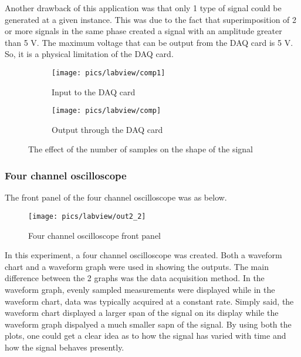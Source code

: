 \noindent
Another drawback of this application was that only 1 type of signal could be generated at a given instance. This was due to the fact that superimposition of 2 or more signals in the same phase created a signal with an amplitude greater than 5 V. The maximum voltage that can be output from the DAQ card is 5 V. So, it is a physical limitation of the DAQ card.


\begin{figure}[!h]
	\centering
	\begin{subfigure}{.5\textwidth}
		\centering
		\texttt{[image: pics/labview/comp1]}
		\caption{Input to the DAQ card}
		\label{fig:sub1}
	\end{subfigure}%
	\begin{subfigure}{.5\textwidth}
		\centering
		\texttt{[image: pics/labview/comp]}
		\caption{Output through the DAQ card }
		\label{fig:sub2}
	\end{subfigure}
	\caption{The effect of the number of samples on the shape of the signal}
	\label{fig:animals}
\end{figure}

\pagebreak

\subsubsection{Four channel oscilloscope}

\noindent
The front panel of the four channel oscilloscope was as below.

\begin{figure}[!h]
	\centering
	\texttt{[image: pics/labview/out2\_2]}
	\caption{Four channel oscilloscope front panel}
	\label{fig:out22}
\end{figure}

\noindent
In this experiment, a four channel oscilloscope was created. Both a waveform chart and a waveform graph were used in showing the outputs. The main difference between the 2 graphs was the data acquisition method. In the waveform graph, evenly sampled measurements were displayed while in the waveform chart, data was typically acquired at a constant rate. Simply said, the waveform chart displayed a larger span of the signal on its display while the waveform graph dispalyed a much smaller sapn of the signal. By using both the plots, one could get a clear idea as to how the signal has varied with time and how the signal behaves presently.\\

